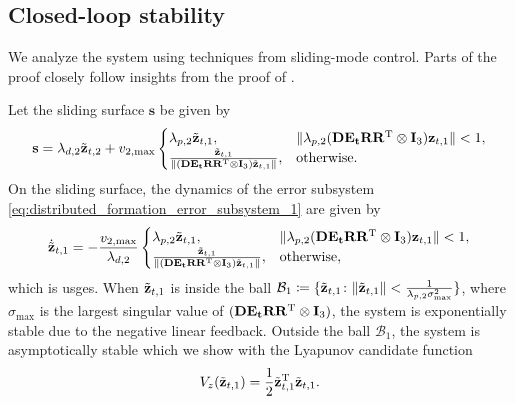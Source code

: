 \subsection{Closed-loop stability}
    We analyze the system using techniques from sliding-mode control. Parts of the proof closely follow insights from the proof of \cite[Theorem 14.1]{khalil_nonlinear_2002}.
    
    Let the sliding surface $\mathbf{s}$ be given by
    \begin{equation}\label{eq:sliding_surface}
        \mathbf{s} = \lambda_{d,2}\tilde{\mathbf{z}}_{t,2}+ v_{2,\max} \begin{cases}
            \lambda_{p,2}\tilde{\mathbf{z}}_{t,1},  & \|\lambda_{p,2}(\mathbf{DE_t R R^{\rm T}}\otimes \mathbf{I}_3)\mathbf{z}_{t,1}\| < 1,\\
            \frac{\tilde{\mathbf{z}}_{t,1}}{\|(\mathbf{DE_t R R^{\rm T}}\otimes \mathbf{I}_3)\tilde{\mathbf{z}}_{t,1}\|},  & \textrm{otherwise}.
        \end{cases}
    \end{equation}
    On the sliding surface, the dynamics of the error subsystem \eqref{eq:distributed_formation_error_subsystem_1} are given by
    \begin{equation}\label{eq:sliding_subsystem}
        \dot{\tilde{\mathbf{z}}}_{t,1} = -\frac{v_{2,\max}}{\lambda_{d,2}}\begin{cases}
            \lambda_{p,2}\tilde{\mathbf{z}}_{t,1},  & \|\lambda_{p,2}(\mathbf{DE_t R R^{\rm T}}\otimes \mathbf{I}_3)\mathbf{z}_{t,1}\| < 1,\\
            \frac{\tilde{\mathbf{z}}_{t,1}}{\|(\mathbf{DE_t R R^{\rm T}}\otimes \mathbf{I}_3)\tilde{\mathbf{z}}_{t,1}\|},  & \textrm{otherwise},
        \end{cases}
    \end{equation}
    which is \gls{usges}. When $\Tilde{\mathbf{z}}_{t,1}$ is inside the ball $\mathcal{B}_1 \coloneqq \{\Tilde{\mathbf{z}}_{t,1} \colon \|\Tilde{\mathbf{z}}_{t,1}\| < \frac{1}{\lambda_{p,2}\sigma_{\max}^2}\}$, where $\sigma_{\max}$ is the largest singular value of $(\mathbf{DE_t R R^{\rm T}}\otimes \mathbf{I}_3)$, the system is exponentially stable due to the negative linear feedback. Outside the ball $\mathcal{B}_1$, the system is asymptotically stable which we show with the Lyapunov candidate function
    \begin{equation}\label{eq:sliding_mode_lyapunov}
        V_z(\tilde{\mathbf{z}}_{t,1}) = \frac{1}{2}\tilde{\mathbf{z}}_{t,1}^{\rm T}\tilde{\mathbf{z}}_{t,1}.
    \end{equation}
